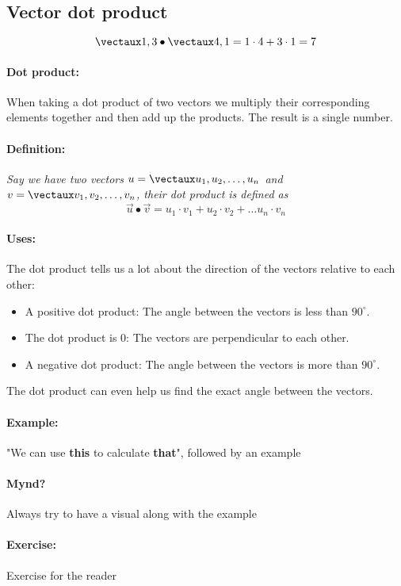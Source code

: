 \documentclass{article}
\begin{document}
\color{white}
\subsection{Vector dot product}
\color{black}

\begin{equation*}
\vect{1,3} \bullet \vect{4,1} = 1\cdot 4 +3\cdot 1 = 7
\end{equation*}



\paragraph{Dot product:} When taking a dot product of two vectors we multiply their corresponding elements together and then add up the products. The result is a single number. 

\color{theorem} \paragraph{Definition:} \textit{Say we have two vectors $u=\vect{u_1, u_2,\dots,u_n}$ and $v=\vect{v_1,v_2,\dots,v_n}$, their dot product is defined as 
\[
\vec{u}\bullet \vec{v} = u_1\cdot v_1 + u_2\cdot v_2+ \dots u_n\cdot v_n 
\]
} \color{black}

\paragraph{Uses:} The dot product tells us a lot about the direction of the vectors relative to each other:
\begin{itemize}
\item A positive dot product: The angle between the vectors is less than $90^\circ$. 
\item The dot product is 0: The vectors are perpendicular to each other. 
\item A negative dot product: The angle between the vectors is more than $90^\circ$. 
\end{itemize}

The dot product can even help us find the exact angle between the vectors. 

\paragraph{Example:} "We can use \textbf{this} to calculate \textbf{that}", followed by an example

\paragraph{Mynd?} Always try to have a visual along with the example

\paragraph{Exercise:} Exercise for the reader


%
\end{document}
